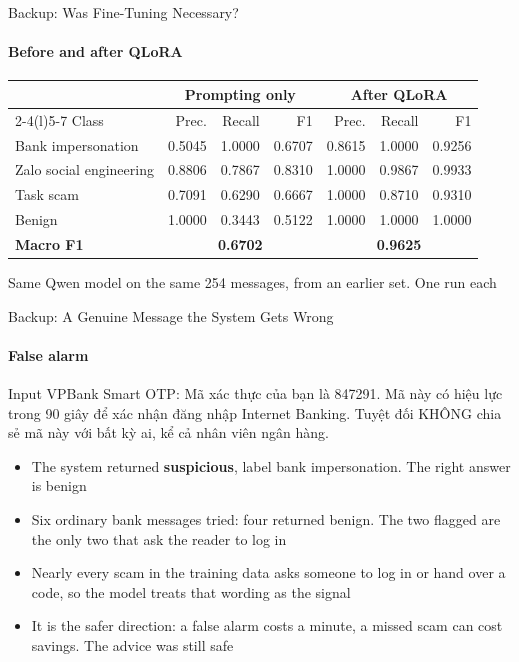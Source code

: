 \documentclass[aspectratio=169,12pt]{beamer}
\begin{document}
\begin{frame}{Backup: Was Fine-Tuning Necessary?}
  \framesubtitle{Before and after QLoRA}
  \centering
  {\footnotesize
  \setlength{\tabcolsep}{5pt}
  \renewcommand{\arraystretch}{1.2}
  \begin{tabular}{lrrrrrr}
    \toprule
    & \multicolumn{3}{c}{\textbf{Prompting only}} & \multicolumn{3}{c}{\textbf{After QLoRA}} \\
    \cmidrule(r){2-4}\cmidrule(l){5-7}
    Class & Prec. & Recall & F1 & Prec. & Recall & F1 \\
    \midrule
    Bank impersonation      & 0.5045 & 1.0000 & 0.6707 & 0.8615 & 1.0000 & 0.9256 \\
    Zalo social engineering & 0.8806 & 0.7867 & 0.8310 & 1.0000 & 0.9867 & 0.9933 \\
    Task scam               & 0.7091 & 0.6290 & 0.6667 & 1.0000 & 0.8710 & 0.9310 \\
    Benign                  & 1.0000 & 0.3443 & 0.5122 & 1.0000 & 1.0000 & 1.0000 \\
    \midrule
    \textbf{Macro F1}       & \multicolumn{3}{c}{\textbf{0.6702}} & \multicolumn{3}{c}{\textbf{0.9625}} \\
    \bottomrule
  \end{tabular}}
  \par\vspace{6pt}
  {\scriptsize Same Qwen model on the same 254 messages, from an earlier set. One run each}
\end{frame}

\begin{frame}{Backup: A Genuine Message the System Gets Wrong}
  \framesubtitle{False alarm}
  \begin{block}{Input}
    \scriptsize VPBank Smart OTP: Mã xác thực của bạn là 847291. Mã này có hiệu lực trong 90 giây để xác nhận đăng nhập Internet Banking. Tuyệt đối KHÔNG chia sẻ mã này với bất kỳ ai, kể cả nhân viên ngân hàng.
  \end{block}
  \begin{itemize}\itemsep 5pt\small
    \item The system returned \textbf{suspicious}, label bank impersonation. The right answer is benign
    \item Six ordinary bank messages tried: four returned benign. The two flagged are the only two that ask the reader to log in
    \item Nearly every scam in the training data asks someone to log in or hand over a code, so the model treats that wording as the signal
    \item It is the safer direction: a false alarm costs a minute, a missed scam can cost savings. The advice was still safe
  \end{itemize}
\end{frame}
\end{document}
